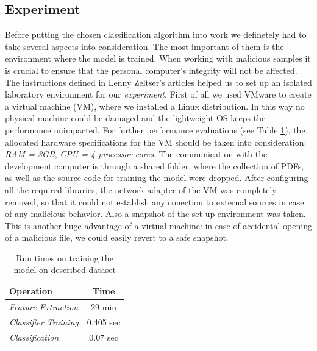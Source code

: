 \subsection{Experiment}
Before putting the chosen classification algorithm into work we definetely had to take several aspects into consideration. The most important of them is the environment where the model is trained. When working with malicious samples it is crucial to ensure that the personal computer's integrity will not be affected. The instructions defined in Lenny Zeltser's articles \cite{zeltser} helped us to set up an isolated laboratory environment for our \textit{experiment}. First of all we used VMware to create a virtual machine (VM), where we installed a Linux distribution. In this way no physical machine could be damaged and the lightweight OS keeps the performance unimpacted. For further performance evaluations (see Table \ref{table:performance}), the allocated hardware specifications for the VM should be taken into consideration: \textit{RAM = 3GB}, \textit{CPU = 4 processor cores}. The communication with the development computer is through a shared folder, where the collection of PDFs, as well as the source code for training the model were dropped. After configuring all the required libraries, the network adapter of the VM was completely removed, so that it could not establish any conection to external sources in case of any malicious behavior. Also a snapshot of the set up environment was taken. This is another huge advantage of a virtual machine: in case of accidental opening of a malicious file, we could easily revert to a safe snapshot. \par 

\begin{table}[H]
	\caption{Run times on training the model on described dataset}
	\label{table:performance}
        \centering
            \begin{tabular}{p{5cm} c}
                \toprule
                
				\textbf{Operation} & \textbf{Time} \\
				\hline 
				\textit{Feature Extraction} & 29 min \\
				\hline 
				\textit{Classifier Training} & 0.405 sec \\
				\hline
				\textit{Classification} & 0.07 sec \\

                \bottomrule
			\end{tabular}
\end{table}

